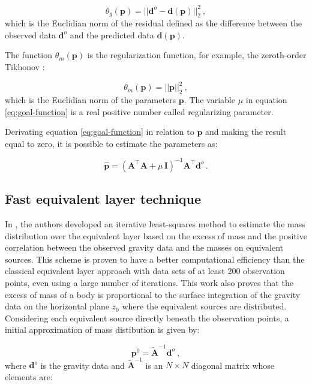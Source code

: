\documentclass[paper]{geophysics}
\begin{document}
\begin{equation}
\theta_g(\mathbf{p}) = ||\mathbf{d}^{o}-\mathbf{d(p)}||_2^2 \: ,
\label{eq:goal-function_d}
\end{equation}
which is the Euclidian norm of the residual defined as the difference between the observed data $\mathbf{d}^{o}$ and the predicted data $\mathbf{d(p)}$.

The function $\theta_m(\mathbf{p})$ is the regularization function, for example, the zeroth-order Tikhonov \cite[]{tikhonov-arsenin1977}:

\begin{equation}
\theta_m(\mathbf{p}) = ||\mathbf{p}||_2^2 \: ,
\label{eq:tikhonov-function}
\end{equation}
which is the Euclidian norm of the parameters $\mathbf{p}$. The variable $\mu$ in equation \ref{eq:goal-function} is a real positive number called regularizing parameter.

Derivating equation \ref{eq:goal-function} in relation to $\mathbf{p}$ and making the result equal to zero, it is possible to estimate the parameters as:

\begin{equation}
\hat{\mathbf{p}} = \left( \mathbf{A}^{\top}\mathbf{A} + 
\mu \, \mathbf{I} \right)^{-1}
\mathbf{A}^{\top} \mathbf{d}^{o} \,.
\label{eq:p-ast-parameter-space}
\end{equation}

\subsection{Fast equivalent layer technique}
In \cite{siqueira2017fast}, the authors developed an iterative least-squares method to estimate the mass distribution over the equivalent layer based on the excess of mass and the positive correlation between the observed gravity data and the masses on equivalent sources. This scheme is proven to have a better computational efficiency than the classical equivalent layer approach with data sets of at least 200 observation points, even using a large number of iterations.
This work also proves that the excess of mass of a body is proportional to the surface integration of the gravity data on the horizontal plane $z_0$ where the equivalent sources are distributed. Considering each equivalent source directly beneath the observation points, a initial approximation of mass distibution is given by:

\begin{equation}
\mathbf{p}^0 = \tilde{\mathbf{A}}^{-1} \mathbf{d}^{o} \: ,
\label{eq:initial_m}
\end{equation}
where $\mathbf{d}^o$ is the gravity data and $\tilde{\mathbf{A}}^{-1}$ is an $N \times N$ diagonal matrix whose elements are:
\end{document}
